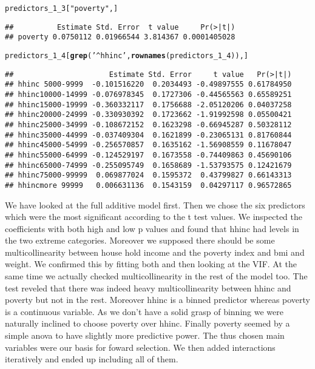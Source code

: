 \documentclass{article}\usepackage[]{graphicx}\usepackage[]{color}
\makeatletter
\newcommand{\hlstr}[1]{\textcolor[rgb]{0.192,0.494,0.8}{#1}}%
\newcommand{\hlstd}[1]{\textcolor[rgb]{0.345,0.345,0.345}{#1}}%
\newcommand{\hlkwd}[1]{\textcolor[rgb]{0.737,0.353,0.396}{\textbf{#1}}}%
\newenvironment{kframe}{%
 \def\at@end@of@kframe{}%
 \ifinner\ifhmode%
  \def\at@end@of@kframe{\end{minipage}}%
  \begin{minipage}{\columnwidth}%
 \fi\fi%
 \def\FrameCommand##1{\hskip\@totalleftmargin \hskip-\fboxsep
 \colorbox{shadecolor}{##1}\hskip-\fboxsep
     \hskip-\linewidth \hskip-\@totalleftmargin \hskip\columnwidth}%
 \MakeFramed {\advance\hsize-\width
   \@totalleftmargin\z@ \linewidth\hsize
   \@setminipage}}%
 {\par\unskip\endMakeFramed%
 \at@end@of@kframe}
\newenvironment{knitrout}{}{} %
\makeatother
\begin{document}
\begin{knitrout}
\begin{kframe}
\begin{alltt}
\hlstd{predictors_1_3[}\hlstr{"poverty"}\hlstd{,]}
\end{alltt}
\begin{verbatim}
##          Estimate Std. Error  t value     Pr(>|t|)
## poverty 0.0750112 0.01966544 3.814367 0.0001405028
\end{verbatim}
\begin{alltt}
\hlstd{predictors_1_4[}\hlkwd{grep}\hlstd{(}\hlstr{'^hhinc'}\hlstd{,}\hlkwd{rownames}\hlstd{(predictors_1_4)),]}
\end{alltt}
\begin{verbatim}
##                      Estimate Std. Error     t value   Pr(>|t|)
## hhinc 5000-9999  -0.101516220  0.2034493 -0.49897555 0.61784950
## hhinc10000-14999 -0.076978345  0.1727306 -0.44565563 0.65589251
## hhinc15000-19999 -0.360332117  0.1756688 -2.05120206 0.04037258
## hhinc20000-24999 -0.330930392  0.1723662 -1.91992598 0.05500421
## hhinc25000-34999 -0.108672152  0.1623298 -0.66945287 0.50328112
## hhinc35000-44999 -0.037409304  0.1621899 -0.23065131 0.81760844
## hhinc45000-54999 -0.256570857  0.1635162 -1.56908559 0.11678047
## hhinc55000-64999 -0.124529197  0.1673558 -0.74409863 0.45690106
## hhinc65000-74999 -0.255095749  0.1658689 -1.53793575 0.12421679
## hhinc75000-99999  0.069877024  0.1595372  0.43799827 0.66143313
## hhincmore 99999   0.006631136  0.1543159  0.04297117 0.96572865
\end{verbatim}
\end{kframe}
\end{knitrout}
\clearpage


We have looked at the full additive model first. Then we chose the six predictors which were the most significant according to the t test values. We inspected the coefficients with both high and low p values and found that hhinc had levels in the two extreme categories. Moreover we supposed there should be some multicollinearity between house hold income and the poverty index and bmi and weight. We confirmed this by fitting both and then looking at the VIF. At the same time we actually checked multicollinearity in the rest of the model too. The test reveled that there was indeed heavy multicollinearity between hhinc and poverty but not in the rest. Moreover hhinc is a binned predictor whereas poverty is a continuous variable. As we don't have a solid grasp of binning we were naturally inclined to choose poverty over hhinc. Finally poverty seemed by a simple anova to have slightly more predictive power. The thus chosen main variables were our basis for foward selection. We then added interactions iteratively and ended up including all of them.
\end{document}
